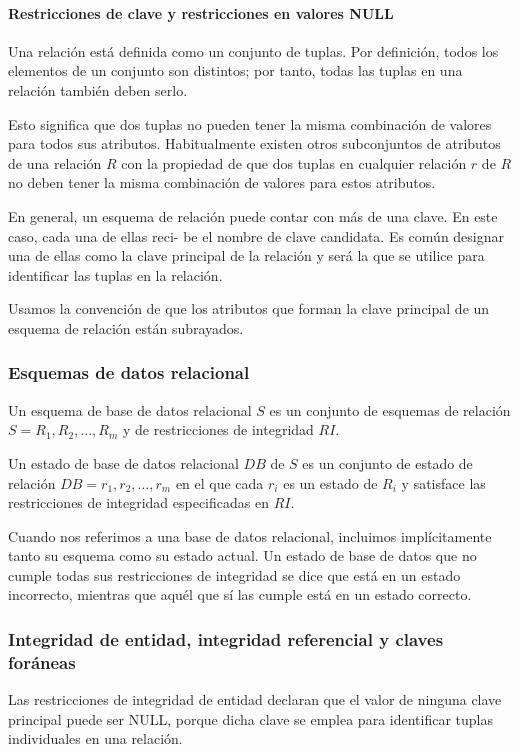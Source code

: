 \paragraph{Restricciones de clave y restricciones en valores NULL}


Una relación está definida como un conjunto de tuplas. Por definición, todos los elementos de un conjunto son distintos; por tanto, todas las tuplas en una relación también deben serlo. 


Esto significa que dos tuplas no pueden tener la misma combinación de valores para todos sus atributos. Habitualmente existen otros subconjuntos de atributos de una relación $R$ con la propiedad de que dos tuplas en cualquier relación $r$ de $R$ no deben tener la misma combinación de valores para estos atributos.


En general, un esquema de relación puede contar con más de una clave. En este caso, cada una de ellas reci-
be el nombre de clave candidata. Es común designar una de ellas como la clave principal de la relación y será la que se utilice para identificar las tuplas en la relación.


Usamos la convención de que los atributos que forman la clave principal de un esquema de relación están subrayados.


\subsubsection{Esquemas de datos relacional}

Un esquema de base de datos relacional $S$ es un conjunto de esquemas de relación $S={R_1, R_2,..., R_m}$ y de restricciones de integridad $RI$. 


Un estado de base de datos relacional $DB$ de $S$ es un conjunto de estado de relación $DB={r_1, r_2,..., r_m}$ en el que cada $r_i$ es un estado de $R_i$ y satisface las restricciones de integridad especificadas en $RI$. 



Cuando nos referimos a una base de datos relacional, incluimos implícitamente tanto su esquema como su estado actual. Un estado de base de datos que no cumple todas sus restricciones de integridad se dice que está en un estado incorrecto, mientras que aquél que sí las cumple está en un estado correcto.


\subsubsection{Integridad de entidad, integridad referencial y claves foráneas} 
Las restricciones de integridad de entidad declaran que el valor de ninguna clave principal puede ser NULL, porque dicha clave se emplea para identificar tuplas individuales en una relación. 

